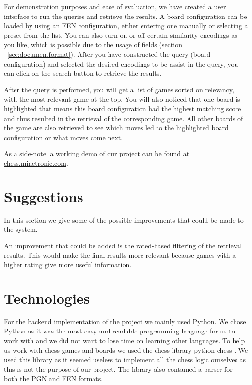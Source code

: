 \documentclass[11pt]{article}
\begin{document}
    For demonstration purposes and ease of evaluation, we have created a user interface to run the queries and retrieve the results. A board configuration can be loaded by using an FEN configuration, either entering one manually or selecting a preset from the list. You can also turn on or off certain similarity encodings as you like, which is possible due to the usage of fields (section ~\ref{sec:documentformat}). After you have constructed the query (board configuration) and selected the desired encodings to be assist in the query, you can click on the search button to retrieve the results.

    After the query is performed, you will get a list of games sorted on relevancy, with the most relevant game at the top. You will also noticed that one board is highlighted that means this board configuration had the highest matching score and thus resulted in the retrieval of the corresponding game. All other boards of the game are also retrieved to see which moves led to the highlighted board configuration or what moves come next.

    As a side-note, a working demo of our project can be found at \href{http://chess.minetronic.com}{chess.minetronic.com}.


    \section{Suggestions}

    In this section we give some of the possible improvements that could be made to the system.

    An improvement that could be added is the rated-based filtering of the retrieval results. This would make the final results more relevant because games with a higher rating give more useful information.


    \section{Technologies}

    For the backend implementation of the project we mainly used Python. We chose Python as it was the most easy and readable programming language for us to work with and we did not want to lose time on learning other languages. To help us work with chess games and boards we used the chess library python-chess \cite{python-chess}. We used this library as it seemed useless to implement all the chess logic ourselves as this is not the purpose of our project. The library also contained a parser for both the PGN and FEN formats.

    

\end{document}
